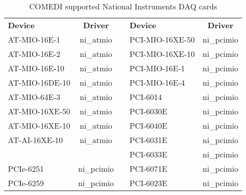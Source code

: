 \begin{fullpage}
\begin{table}
\caption{COMEDI supported National Instruments DAQ cards}
\label{COMEDI NI}
\begin{center}
\vspace{.5cm}
\begin{tabular}{lcclc}
 \textbf{Device} & \textbf{Driver} & & \textbf{Device} & \textbf{Driver}\\
AT-MIO-16E-1 & ni\_atmio & & PCI-MIO-16XE-50 & ni\_pcimio\\ 
AT-MIO-16E-2 & ni\_atmio & & PCI-MIO-16XE-10 & ni\_pcimio\\ 
AT-MIO-16E-10 & ni\_atmio & & PCI-MIO-16E-1 & ni\_pcimio\\ 
AT-MIO-16DE-10 & ni\_atmio & & PCI-MIO-16E-4 & ni\_pcimio\\ 
AT-MIO-64E-3 & ni\_atmio & & PCI-6014 & ni\_pcimio\\ 
AT-MIO-16XE-50 & ni\_atmio & & PCI-6030E & ni\_pcimio\\ 
AT-MIO-16XE-10 & ni\_atmio & & PCI-6040E & ni\_pcimio\\ 
AT-AI-16XE-10 & ni\_atmio &  & PCI-6031E & ni\_pcimio\\ 

& & & PCI-6033E & ni\_pcimio\\ 
PCIe-6251 & ni\_pcimio &  & PCI-6071E & ni\_pcimio\\ 
PCIe-6259 & ni\_pcimio &  & PCI-6023E & ni\_pcimio\\ 


\end{tabular}
\end{center}
\end{table}
\end{fullpage}
